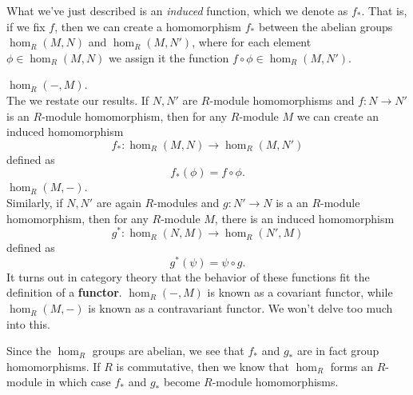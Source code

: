 \begin{minipage}{0.6\textwidth}
    What we've just described is an \textit{induced} function,
    which we denote as $f_*$.
    That is, if we fix $f$, then we can create a homomorphism
    $f_*$  between the abelian groups $\hom_R(M, N)$ and
    $\hom_R(M, N')$, where for each element $\phi \in \hom_R(M, N)$
    we assign it the function $f \circ \phi \in \hom_R(M, N')$.
\end{minipage}
\hfill
\begin{minipage}{0.4\textwidth}
    \begin{center}
    \end{center}
\end{minipage}


\noindent $\hom_R(- , M)$.\\
The we restate our results. If $N, N'$ are $R$-module homomorphisms and $f: N \to N'$ is an $R$-module
homomorphism, then for any $R$-module $M$ we can create an induced
homomorphism 
\[ 
    f_* : \hom_R(M, N) \to \hom_R(M, N')
\] 
defined as 
\[
    f_*(\phi) = f \circ \phi.
\]
\noindent $\hom_R(M, -)$.\\
Similarly, if $N, N'$ are again $R$-modules and $g: N' \to N$ is a an
$R$-module homomorphism, then for any $R$-module $M$, there is
an induced homomorphism 
\[
    g^*: \hom_R(N, M) \to \hom_R(N', M)
\]
defined as 
\[
    g^*(\psi) = \psi \circ g.
\]
It turns out in category theory that the behavior of these
functions fit the definition of a \textbf{functor}.
$\hom_R(- , M)$ is known as a covariant functor,
while $\hom_R(M, -)$ is known as a contravariant
functor. We won't delve too much into this.

\textcolor{NavyBlue}{Since the $\hom_R$ groups are abelian, we see that $f_*$ and $g_*$
are in fact group homomorphisms. If $R$ is commutative, then we
know that $\hom_R$ forms an $R$-module in which case $f_*$ and
$g_*$ become $R$-module homomorphisms.}
\\

